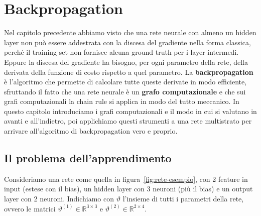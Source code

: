 \chapter{Backpropagation}\label{ch:backprop}
Nel capitolo precedente abbiamo visto che una rete neurale con almeno un hidden layer non può essere addestrata con la discesa del gradiente nella forma classica, perché il training set non fornisce alcuna ground truth per i layer intermedi. Eppure la discesa del gradiente ha bisogno, per ogni parametro della rete, della derivata della funzione di costo rispetto a quel parametro. La \textbf{backpropagation} è l'algoritmo che permette di calcolare tutte queste derivate in modo efficiente, sfruttando il fatto che una rete neurale è un \textbf{grafo computazionale} e che sui grafi computazionali la chain rule si applica in modo del tutto meccanico. In questo capitolo introduciamo i grafi computazionali e il modo in cui si valutano in avanti e all'indietro, poi applichiamo questi strumenti a una rete multistrato per arrivare all'algoritmo di backpropagation vero e proprio.

\section{Il problema dell'apprendimento}
Consideriamo una rete come quella in figura~\ref{fig:rete-esempio}, con 2 feature in input (estese con il bias), un hidden layer con 3 neuroni (più il bias) e un output layer con 2 neuroni. Indichiamo con $\vartheta$ l'insieme di tutti i parametri della rete, ovvero le matrici $\vartheta^{(1)} \in \mathbb{R}^{3\times 3}$ e $\vartheta^{(2)} \in \mathbb{R}^{2 \times 4}$.

